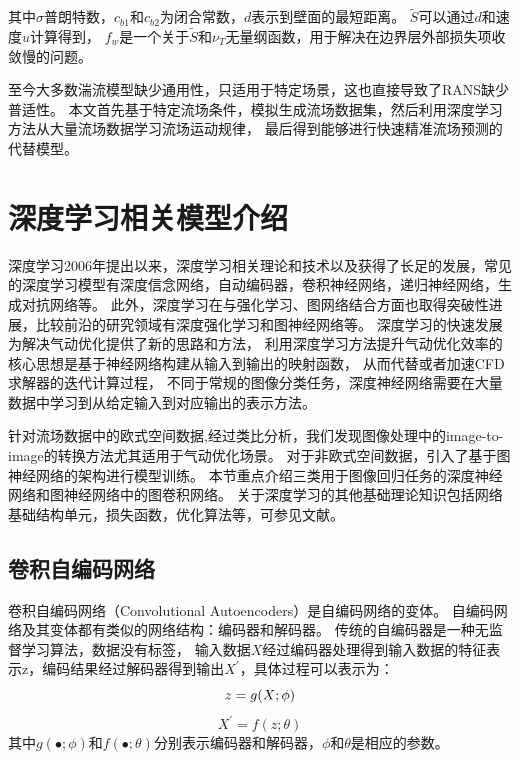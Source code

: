 \noindent 其中$\sigma$普朗特数，$c_{b 1}$和$c_{b 2}$为闭合常数，$d$表示到壁面的最短距离。
$\tilde{S}$可以通过$d$和速度$u$计算得到，
$f_{w}$是一个关于$\tilde{S}$和$\nu_{T}$无量纲函数，用于解决在边界层外部损失项收敛慢的问题。

至今大多数湍流模型缺少通用性，只适用于特定场景，这也直接导致了RANS缺少普适性。
本文首先基于特定流场条件，模拟生成流场数据集，然后利用深度学习方法从大量流场数据学习流场运动规律，
最后得到能够进行快速精准流场预测的代替模型。


\section{深度学习相关模型介绍}
深度学习2006年提出以来，深度学习相关理论和技术以及获得了长足的发展，常见的深度学习模型有深度信念网络\cite{深度信念网络}，自动编码器\cite{Bengio2013Representation}，卷积神经网络\cite{Lecun1998Gradient}，递归神经网络\cite{Williams2014A}，生成对抗网络\cite{GAN}等。
此外，深度学习在与强化学习、图网络结合方面也取得突破性进展，比较前沿的研究领域有深度强化学习\cite{Deepreinforcementlearning}和图神经网络\cite{2016Semi}等。
深度学习的快速发展为解决气动优化提供了新的思路和方法，
利用深度学习方法提升气动优化效率的核心思想是基于神经网络构建从输入到输出的映射函数，
从而代替或者加速CFD求解器的迭代计算过程，
不同于常规的图像分类任务，深度神经网络需要在大量数据中学习到从给定输入到对应输出的表示方法。

针对流场数据中的欧式空间数据,经过类比分析，我们发现图像处理中的image-to-image\cite{DBLP:conf/miccai/RonnebergerFB15,DBLP:conf/cvpr/LongSD15,isola2017image,CycleGAN2017,DBLP:conf/cvpr/AmodioK19}的转换方法尤其适用于气动优化场景。
对于非欧式空间数据，引入了基于图神经网络的架构进行模型训练。
本节重点介绍三类用于图像回归任务的深度神经网络和图神经网络中的图卷积网络。
关于深度学习的其他基础理论知识包括网络基础结构单元，损失函数，优化算法等，可参见文献\cite{dnnsurvey}。

\subsection{卷积自编码网络}
卷积自编码网络（Convolutional Autoencoders）是自编码网络\cite{Bengio2013Representation}的变体。
自编码网络及其变体都有类似的网络结构：编码器和解码器。
传统的自编码器是一种无监督学习算法，数据没有标签，
输入数据$X$经过编码器处理得到输入数据的特征表示z，编码结果经过解码器得到输出$X^{\prime}$，具体过程可以表示为：
\begin{equation}
z=g(X ; \phi) 
\vspace{-0.2cm}
\end{equation}
\begin{equation}
X^{\prime}=f(z ; \theta)
\end{equation}
其中$g(\bullet ; \phi)$和$f(\bullet ; \theta)$分别表示编码器和解码器，$\phi$和$\theta$是相应的参数。

